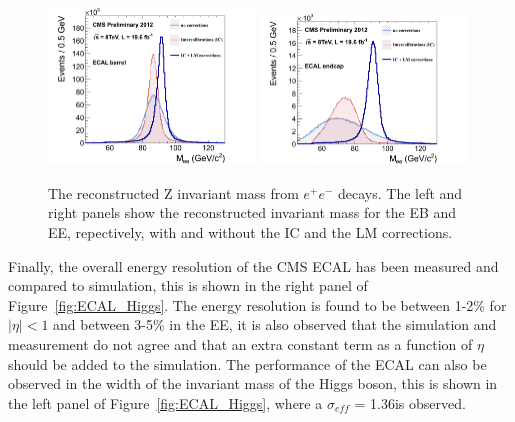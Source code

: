 \begin{figure}
 \centering
\includegraphics[width=0.49\textwidth]{CMS_DetectorFigures/noIC_noLaser-regrCorr_ele-EB.png}
\includegraphics[width=0.49\textwidth]{CMS_DetectorFigures/propaganda_noIC_noLaser-regrCorr_ele-EE.png}
\caption{The reconstructed Z invariant mass from $e^{+}e^{-}$
  decays. The left and right panels show the reconstructed invariant mass for
  the EB and EE, repectively, with and without the IC and the LM corrections.\label{fig:ECAL_E_IC_LM}}
\end{figure}
 Finally, the overall energy resolution of the CMS ECAL has been measured
 and compared to simulation, this is shown in the right panel of
 Figure~\ref{fig:ECAL_Higgs}. The energy resolution is found to be
 between 1-2\% for $|\eta|<1$ and between 3-5\% in the EE, it is also
 observed that the simulation and measurement do not agree and that an
 extra constant term as a function of $\eta$ should be added to the
 simulation. The performance of the ECAL can also be observed in the
 width of the invariant mass of the Higgs boson, this is shown in the
 left panel of Figure~\ref{fig:ECAL_Higgs}, where a $\sigma_{eff}$ =
 1.36\GeV is observed.
